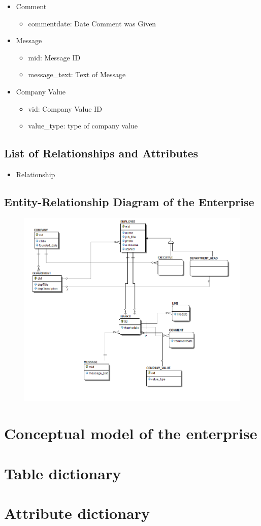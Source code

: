 \documentclass[11pt]{report}
\begin{document}
\begin{itemize}
\item Comment
    \begin{itemize}
    \item commentdate: Date Comment was Given
    \end{itemize}
\item Message
    \begin{itemize}
    \item mid: Message ID
    \item message\_text: Text of Message
    \end{itemize}
\item Company Value
    \begin{itemize}
    \item vid: Company Value ID
    \item value\_type: type of company value
    \end{itemize}
\end{itemize}
\clearpage

\subsection{List of Relationships and Attributes}
\begin{itemize}
\item Relationship
\end{itemize}
\clearpage

\subsection{Entity-Relationship Diagram of the Enterprise}

\begin{figure}[!htb]
\centering
\includegraphics[scale=.7]{./images/ERD11-4.png}
\end{figure}
\clearpage

\section{Conceptual model of the enterprise}
\section{Table dictionary}
\section{Attribute dictionary}
\end{document}
